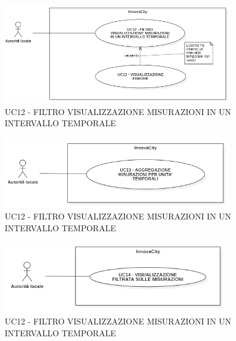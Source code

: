 


\begin{figure}[H]
    \centering
    \includegraphics[width=0.9\textwidth]{../Images/uc12.PNG}
    \caption{UC12 - FILTRO VISUALIZZAZIONE MISURAZIONI IN UN INTERVALLO TEMPORALE}
    \label{fig:UC7}
\end{figure}

\begin{figure}[H]
    \centering
    \includegraphics[width=0.9\textwidth]{../Images/uc13.PNG}
    \caption{UC12 - FILTRO VISUALIZZAZIONE MISURAZIONI IN UN INTERVALLO TEMPORALE}
    \label{fig:UC7}
\end{figure}

\begin{figure}[H]
    \centering
    \includegraphics[width=0.9\textwidth]{../Images/uc14.PNG}
    \caption{UC12 - FILTRO VISUALIZZAZIONE MISURAZIONI IN UN INTERVALLO TEMPORALE}
    \label{fig:UC7}
\end{figure}



\setcounter{rowcounter}{1}
